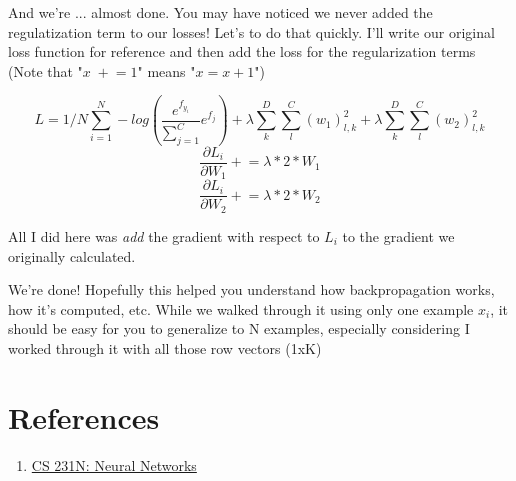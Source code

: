 \documentclass[12pt]{article}
\begin{document}
And we're ... almost done. You may have noticed we never added the regulatization term to our losses! 
Let's to do that quickly. I'll write our original loss function for reference and then add the loss for 
the regularization terms (Note that "$x \; +\!= 1$" means "$x = x + 1$")

\begin{equation}
    L = 1/N \sum_{i=1}^N - log(\frac{e^{f_{y_i}}}{\sum_{j=1}^C} e^{f_j}) + 
    \lambda \sum_{k}^D \sum_{l}^C (w_1)_{l, k}^2 + 
    \lambda \sum_{k}^D \sum_{l}^C (w_2)_{l, k}^2
\end{equation}
\begin{equation}
    \frac{\partial L_i}{\partial W_1} +\!= \lambda * 2 * W_1
\end{equation}
\begin{equation}
    \frac{\partial L_i}{\partial W_2} +\!= \lambda * 2 * W_2
\end{equation}

All I did here was \emph{add} the gradient with respect to $L_i$ to the gradient we originally 
calculated. 

We're done! Hopefully this helped you understand how backpropagation works, how it's computed, 
etc. While we walked through it using only one example $x_i$, it should be easy for you to generalize 
to N examples, especially considering I worked through it with all those row vectors (1xK)
\paragraph{}


\section{References}
\begin{enumerate}
    \item \href{https://cs231n.github.io/neural-networks-1/}{CS 231N: Neural Networks}
\end{enumerate}
\end{document}
